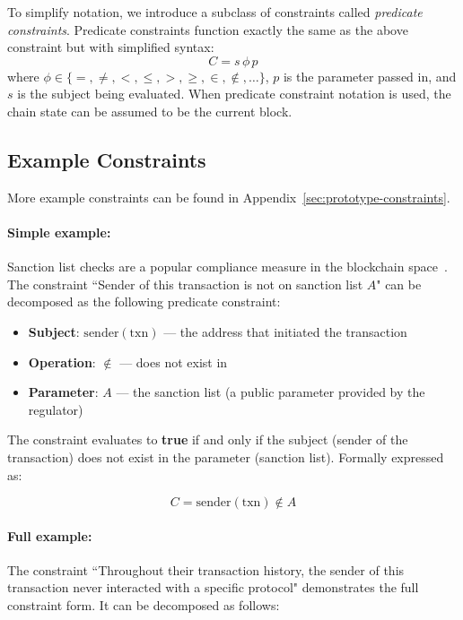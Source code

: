 \documentclass[9pt]{extreport}
\begin{document}
To simplify notation, we introduce a subclass of constraints called \textit{predicate constraints}.  Predicate constraints function exactly the same as the above constraint but with simplified syntax:
$$C = s \,\phi\, p$$
where $\phi \in \{=, \neq, <, \leq, >, \geq, \in, \notin, \ldots\}$, $p$ is the parameter passed in, and $s$ is the subject being evaluated.  When predicate constraint notation is used, the chain state can be assumed to be the current block.  

\subsection{Example Constraints}
More example constraints can be found in Appendix~\ref{sec:prototype-constraints}.

\paragraph{Simple example:}
Sanction list checks are a popular compliance measure in the blockchain space~\cite{solomka2025zeroknowledge, tornadocashprimer}.  The constraint ``Sender of this transaction is not on sanction list $A$" can be decomposed as the following predicate constraint:

\begin{itemize}
    \item \textbf{Subject}: $\text{sender}(\text{txn})$ --- the address that initiated the transaction
    \item \textbf{Operation}: $\notin$ --- does not exist in
    \item \textbf{Parameter}: $A$ --- the sanction list (a public parameter provided by the regulator)
\end{itemize}

The constraint evaluates to \textbf{true} if and only if the subject (sender of the transaction) does not exist in the parameter (sanction list).  Formally expressed as:

$$C = \text{sender}(\text{txn}) \notin A$$

\paragraph{Full example:} 
The constraint ``Throughout their transaction history, the sender of this transaction never interacted with a specific protocol" demonstrates the full constraint form.  It can be decomposed as follows:
\end{document}

